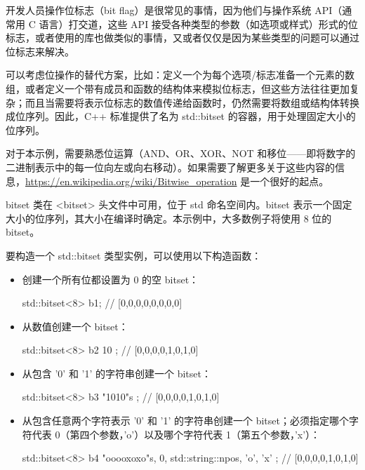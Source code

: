 开发人员操作位标志（bit flag）是很常见的事情，因为他们与操作系统 API（通常用 C 语言）打交道，这些 API 接受各种类型的参数（如选项或样式）形式的位标志，或者使用的库也做类似的事情，又或者仅仅是因为某些类型的问题可以通过位标志来解决。

可以考虑位操作的替代方案，比如：定义一个为每个选项/标志准备一个元素的数组，或者定义一个带有成员和函数的结构体来模拟位标志，但这些方法往往更加复杂；而且当需要将表示位标志的数值传递给函数时，仍然需要将数组或结构体转换成位序列。因此，C++ 标准提供了名为 std::bitset 的容器，用于处理固定大小的位序列。


对于本示例，需要熟悉位运算（AND、OR、XOR、NOT 和移位——即将数字的二进制表示中的每一位向左或向右移动）。如果需要了解更多关于这些内容的信息，\url{https://en.wikipedia.org/wiki/Bitwise_operation} 是一个很好的起点。

bitset 类在 <bitset> 头文件中可用，位于 std 命名空间内。bitset 表示一个固定大小的位序列，其大小在编译时确定。本示例中，大多数例子将使用 8 位的 bitset。


要构造一个 std::bitset 类型实例，可以使用以下构造函数：

\begin{itemize}
\item
创建一个所有位都设置为 0 的空 bitset：

\begin{cpp}
std::bitset<8> b1;            // [0,0,0,0,0,0,0,0]
\end{cpp}

\item
从数值创建一个 bitset：

\begin{cpp}
std::bitset<8> b2{ 10 };      // [0,0,0,0,1,0,1,0]
\end{cpp}

\item
从包含 '0' 和 '1' 的字符串创建一个 bitset：

\begin{cpp}
std::bitset<8> b3{ "1010"s }; // [0,0,0,0,1,0,1,0]
\end{cpp}

\item
从包含任意两个字符表示 '0' 和 '1' 的字符串创建一个 bitset；必须指定哪个字符代表 0（第四个参数，'o'）以及哪个字符代表 1（第五个参数，'x'）：

\begin{cpp}
std::bitset<8> b4
    { "ooooxoxo"s, 0, std::string::npos, 'o', 'x' };
    // [0,0,0,0,1,0,1,0]
\end{cpp}
\end{itemize}

